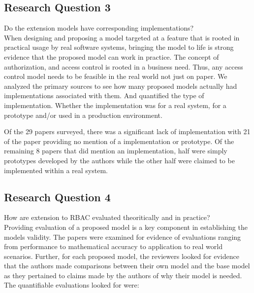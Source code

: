 \subsection{Research Question 3}

Do the extension models have corresponding implementations? \\

When designing and proposing a model targeted at a feature that is rooted in practical
usage by real software systems, bringing the model to life is strong evidence that the
proposed model can work in practice.  The concept of authorization, and access control
is rooted in a business need.  Thus, any access control model needs to be feasible
in the real world not just on paper.  We analyzed the primary sources to see how many
proposed models actually had implementations associated with them.  And quantified the
type of implementation.  Whether the implementation was for a real system, for a prototype
and/or used in a production environment.

Of the 29 papers surveyed, there was a significant lack of implementation with 21 of the paper providing no
mention of a implementation or prototype.  Of the remaining 8 papers that did mention an implementation, half 
were simply prototypes developed by the authors while the other half were claimed to be implemented within a real
system.

\subsection{Research Question 4}

How are extension to RBAC evaluated theoritically and in practice? \\

Providing evaluation of a proposed model is a key component in establishing the models validity.  The papers were examined
for evidence of evaluations ranging from performance to mathematical accuracy to application to real world scenarios.  Further,
for each proposed model, the reviewers looked for evidence that the authors made comparisons between their own model and the base
model as they pertained to claims made by the authors of why their model is needed.  The quantifiable evaluations looked for were:

